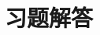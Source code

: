 \documentclass[UTF8,fontset=fandol,11pt]{ctexart}
\begin{document}
\makehandouttitle

\bigskip
\section*{习题解答}

\end{document}
